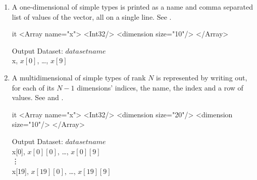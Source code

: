 \documentclass[justify]{dods-paper}
\begin{document}
\begin{enumerate}
\item A one-dimensional \Array of simple types is printed as a name and comma
  separated list of values of the vector, all on a single line. See .

\begin{minipage}[t]{2.5in}

\begin{vcode}{it}
<Array name="x">
  <Int32/>
  <dimension size="10"/>
</Array>
\end{vcode}
\end{minipage}
\begin{minipage}[t]{5in}
\begin{textoutput}{Output}
Dataset: $dataset name$\\
x, $x[0]$, \ldots, $x[9]$
\end{textoutput}
\end{minipage}

\item A multidimensional \Array of simple types of rank $N$ is represented by
  writing out, for each of its $N-1$ dimensions' indices, the name, the index
  and a row of values. See  and .

\begin{minipage}[t]{2.5in}

\begin{vcode}{it}
<Array name="x">
  <Int32/>
  <dimension size="20"/>
  <dimension size="10"/>
</Array>
\end{vcode}
\end{minipage}
\begin{minipage}[t]{5in}
\begin{textoutput}{Output}
Dataset: $dataset name$\\
x[0], $x[0][0]$, \ldots, $x[0][9]$\\
\vdots\\
x[19], $x[19][0]$, \ldots, $x[19][9]$\\
\end{textoutput}
\end{minipage}

\begin{minipage}[t]{2.5in}


\end{minipage}
\end{enumerate}
\end{document}
